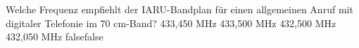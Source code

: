     {Welche Frequenz empfiehlt der IARU-Bandplan für einen allgemeinen Anruf mit digitaler Telefonie im 70 cm-Band?}
    {433,450 MHz}
    {433,500 MHz}
    {432,500 MHz}
    {432,050 MHz}
    {false}{false}